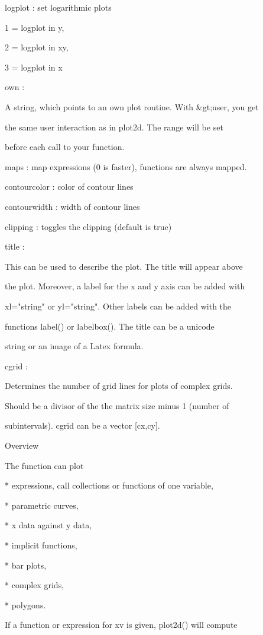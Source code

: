 \documentclass{article}
\begin{document}
logplot   : set logarithmic plots


            1 = logplot in y,


            2 = logplot in xy,


            3 = logplot in x


own       :


  A string, which points to an own plot routine. With &gt;user, you get


  the same user interaction as in plot2d. The range will be set


  before each call to your function.


maps      : map expressions (0 is faster), functions are always mapped.


contourcolor : color of contour lines


contourwidth : width of contour lines


clipping  : toggles the clipping (default is true)


title     :


  This can be used to describe the plot. The title will appear above


  the plot. Moreover, a label for the x and y axis can be added with


  xl="string" or yl="string". Other labels can be added with the


  functions label() or labelbox(). The title can be a unicode


  string or an image of a Latex formula.


cgrid     :


  Determines the number of grid lines for plots of complex grids.


  Should be a divisor of the the matrix size minus 1 (number of


  subintervals). cgrid can be a vector [cx,cy].


Overview


The function can plot


* 
expressions, call collections or functions of one variable,

* 
parametric curves,

* 
x data against y data,

* 
implicit functions,

* 
bar plots,

* 
complex grids,

* 
polygons.


If a function or expression for xv is given, plot2d() will compute
\end{document}
